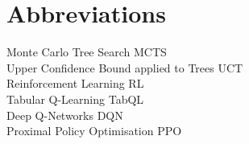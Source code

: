 \section*{Abbreviations}
\large 
Monte Carlo Tree Search \hfill MCTS \\
Upper Confidence Bound applied to Trees \hfill UCT \\
Reinforcement Learning \hfill RL \\
Tabular Q-Learning \hfill TabQL \\
Deep Q-Networks \hfill DQN \\
Proximal Policy Optimisation \hfill PPO \\